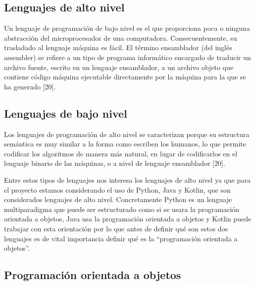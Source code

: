\subsection{Lenguajes de alto nivel}

\begin{list}{}%
    {\setlength{\leftmargin}{1cm}\setlength{\rightmargin}{1cm}}
    \item\relax
    \small

Un lenguaje de programación de bajo nivel es el que proporciona poca o ninguna abstracción del microprocesador de una computadora. Consecuentemente, su trasladado al lenguaje máquina es fácil. El término ensamblador (del inglés assembler) se refiere a un tipo de programa informático encargado de traducir un archivo fuente, escrito en un lenguaje ensamblador, a un archivo objeto que contiene código máquina ejecutable directamente por la máquina para la que se ha generado [20]. 

\end{list}

\subsection{Lenguajes de bajo nivel}

\begin{list}{}%
    {\setlength{\leftmargin}{1cm}\setlength{\rightmargin}{1cm}}
    \item\relax
    \small

Los lenguajes de programación de alto nivel se caracterizan porque su estructura semántica es muy similar a la forma como escriben los humanos, lo que permite codificar los algoritmos de manera más natural, en lugar de codificarlos en el lenguaje binario de las máquinas, o a nivel de lenguaje ensamblador [20]. 

\end{list}

Entre estos tipos de lenguajes nos interesa los lenguajes de alto nivel ya que para el proyecto estamos considerando el uso de Python, Java y Kotlin, que son considerados lenguajes de alto nivel. Concretamente Python es un lenguaje multiparadigma que puede ser estructurado como si se usara la programación orientada a objetos, Java usa la programación orientada a objetos y Kotlin puede trabajar con esta orientación por lo que antes de definir qué son estos dos lenguajes es de vital importancia definir qué es la “programación orientada a objetos”.


\subsection{Programación orientada a objetos}

